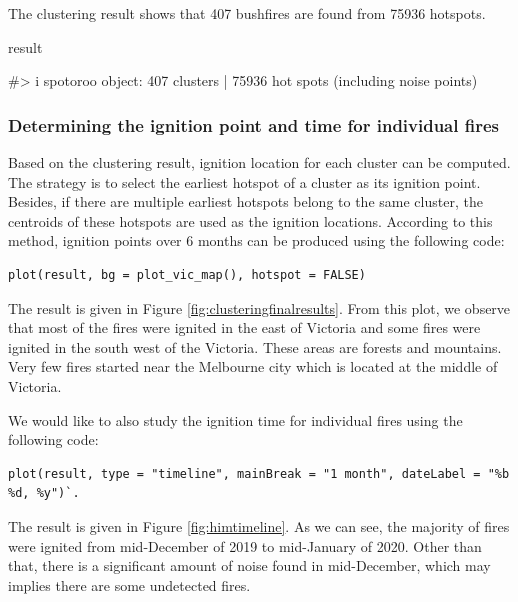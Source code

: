 The clustering result shows that 407 bushfires are found from 75936
hotspots.

\begin{Schunk}
\begin{Sinput}
result
\end{Sinput}
\begin{Soutput}
#> i spotoroo object: 407 clusters | 75936 hot spots (including noise points)
\end{Soutput}
\end{Schunk}

\hypertarget{determining-the-ignition-point-and-time-for-individual-fires}{%
\subsubsection{Determining the ignition point and time for individual
fires}\label{determining-the-ignition-point-and-time-for-individual-fires}}

Based on the clustering result, ignition location for each cluster can
be computed. The strategy is to select the earliest hotspot of a cluster
as its ignition point. Besides, if there are multiple earliest hotspots
belong to the same cluster, the centroids of these hotspots are used as
the ignition locations. According to this method, ignition points over 6
months can be produced using the following code:

\begin{verbatim}
plot(result, bg = plot_vic_map(), hotspot = FALSE)
\end{verbatim}

The result is given in Figure \ref{fig:clusteringfinalresults}. From
this plot, we observe that most of the fires were ignited in the east of
Victoria and some fires were ignited in the south west of the Victoria.
These areas are forests and mountains. Very few fires started near the
Melbourne city which is located at the middle of Victoria.

We would like to also study the ignition time for individual fires using
the following code:

\begin{verbatim}
plot(result, type = "timeline", mainBreak = "1 month", dateLabel = "%b %d, %y")`. 
\end{verbatim}

The result is given in Figure \ref{fig:himtimeline}. As we can see, the
majority of fires were ignited from mid-December of 2019 to mid-January
of 2020. Other than that, there is a significant amount of noise found
in mid-December, which may implies there are some undetected fires.

